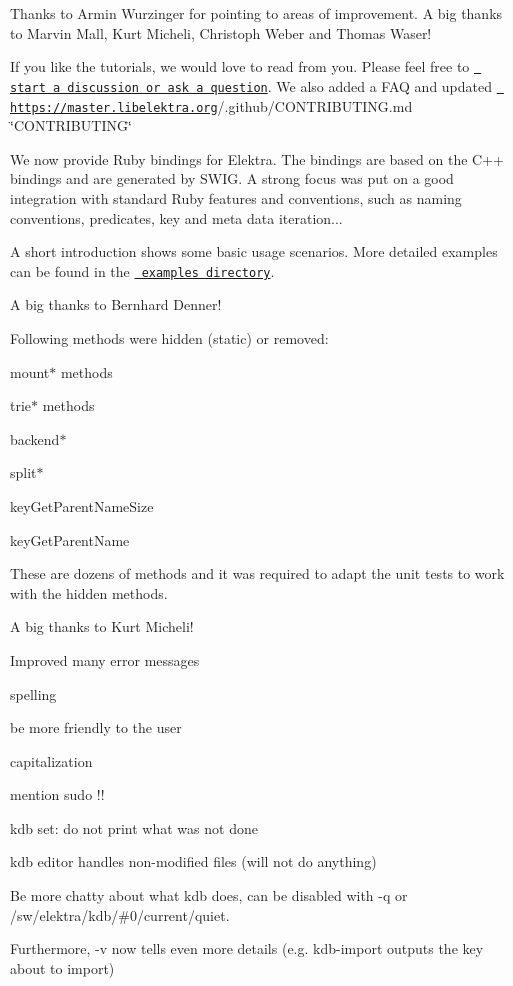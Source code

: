 Thanks to Armin Wurzinger for pointing to areas of improvement. A big thanks to Marvin Mall, Kurt Micheli, Christoph Weber and Thomas Waser!

If you like the tutorials, we would love to read from you. Please feel free to \href{https://git.libelektra.org/issues/new}{\texttt{ start a discussion or ask a question}}. We also added a F\+AQ and updated \href{https://master.libelektra.org}{\texttt{ https\+://master.\+libelektra.\+org}}/.github/\+C\+O\+N\+T\+R\+I\+B\+U\+T\+I\+N\+G.\+md \char`\"{}\+C\+O\+N\+T\+R\+I\+B\+U\+T\+I\+N\+G\char`\"{}

We now provide Ruby bindings for Elektra. The bindings are based on the C++ bindings and are generated by S\+W\+IG. A strong focus was put on a good integration with standard Ruby features and conventions, such as naming conventions, predicates, key and meta data iteration...

A short introduction shows some basic usage scenarios. More detailed examples can be found in the \href{https://master.libelektra.org/src/bindings/swig/ruby/examples}{\texttt{ examples directory}}.

A big thanks to Bernhard Denner!

Following methods were hidden ({\ttfamily static}) or removed\+:


\begin{DoxyItemize}
\item {\ttfamily mount$\ast$} methods
\item {\ttfamily trie$\ast$} methods
\item {\ttfamily backend$\ast$}
\item {\ttfamily split$\ast$}
\item {\ttfamily key\+Get\+Parent\+Name\+Size}
\item {\ttfamily key\+Get\+Parent\+Name}
\end{DoxyItemize}

These are dozens of methods and it was required to adapt the unit tests to work with the hidden methods.

A big thanks to Kurt Micheli!


\begin{DoxyItemize}
\item Improved many error messages
\begin{DoxyItemize}
\item spelling
\item be more friendly to the user
\item capitalization
\item mention {\ttfamily sudo !!}
\end{DoxyItemize}
\item {\ttfamily kdb set}\+: do not print what was not done
\item {\ttfamily kdb editor} handles non-\/modified files (will not do anything)
\item Be more chatty about what {\ttfamily kdb} does, can be disabled with {\ttfamily -\/q} or {\ttfamily /sw/elektra/kdb/\#0/current/quiet}.
\item Furthermore, {\ttfamily -\/v} now tells even more details (e.\+g. {\ttfamily kdb-\/import} outputs the key about to import)
\end{DoxyItemize}


